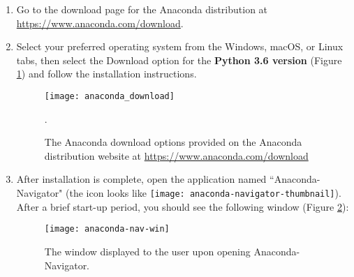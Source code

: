 \begin{enumerate}
    \item Go to the download page for the Anaconda distribution at \\ \url{https://www.anaconda.com/download}. 
    \item Select your preferred operating system from the Windows, macOS, or Linux tabs, then select the Download option for the \textbf{Python 3.6 version} (Figure \ref{anaconda_download}) and follow the installation instructions.
    \begin{figure}[h]
        \begin{center}
        \texttt{[image: anaconda\_download]}
        \caption{The Anaconda download options provided on the Anaconda distribution website at \protect \url{https://www.anaconda.com/download}}.
        \label{anaconda_download}
        \end{center}
    \end{figure}


    \item After installation is complete, open the application named ``Anaconda-Navigator" (the icon looks like \texttt{[image: anaconda-navigator-thumbnail]}). After a brief start-up period, you should see the following window (Figure \ref{anaconda-nav-win}):
    \begin{figure}[htbp]
        \begin{center}
        \texttt{[image: anaconda-nav-win]}
        \caption{The window displayed to the user upon opening Anaconda-Navigator.}
        \label{anaconda-nav-win}
        \end{center}
    \end{figure}
\end{enumerate}


